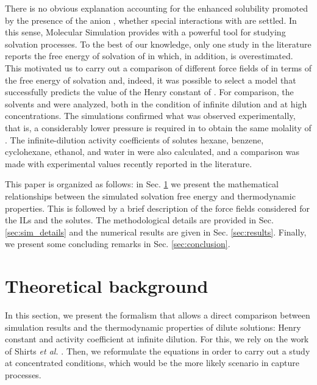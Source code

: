 \documentclass[3p,twocolumn]{elsarticle}
\begin{document}
There is no obvious explanation accounting for the enhanced solubility promoted by the presence of the anion \ce{[B(CN)_4]^-]}, whether special interactions with  are settled. In this sense, Molecular Simulation provides with a powerful tool for studying solvation processes. To the best of our knowledge, only one study in the literature reports the free energy of solvation of  in \ce{[emim][B(CN)_4]} \cite{Liu_2014_1} which, in addition, is overestimated. This motivated us to carry out a comparison of different force fields of \ce{[emim][B(CN)_4]} in terms of the free energy of solvation and, indeed,  it was possible to select a model that successfully predicts the value of the Henry constant of . For comparison, the solvents \ce{[emim][B(CN)_4]} and \ce{[emim][NTf_2]} were analyzed, both in the condition of infinite dilution and at high concentrations. The simulations confirmed what was observed experimentally, that is, a considerably lower pressure is required in \ce{[emim][B(CN)_4]} to obtain the same molality of . The infinite-dilution activity coefficients of solutes hexane, benzene, cyclohexane, ethanol, and water in \ce{[emim][B(CN)_4]} were also calculated, and a comparison was made with experimental values recently reported in the literature.

This paper is organized as follows: in Sec. \ref{sec:theory} we present the mathematical relationships between the simulated solvation free energy and thermodynamic properties. This is followed by a brief description of the force fields considered for the ILs and the solutes. The methodological details are provided in Sec. \ref{sec:sim_details} and the numerical results are given in Sec. \ref{sec:results}. Finally, we present some concluding remarks in Sec. \ref{sec:conclusion}.

\section{Theoretical background}
\label{sec:theory}

In this section, we present the formalism that allows a direct comparison between simulation results and the thermodynamic properties of dilute solutions: Henry constant and activity coefficient at infinite dilution. For this, we rely on the work of Shirts \textit{et al.} \cite{Shirts_2003}. Then, we reformulate the equations in order to carry out a study at concentrated conditions, which would be the more likely scenario in  capture processes.
\end{document}
